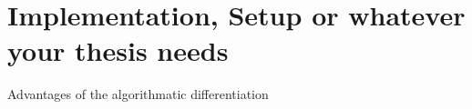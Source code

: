 \section{Implementation, Setup or whatever your thesis needs}
\label{sec:main}
%

Advantages of the algorithmatic differentiation
%
